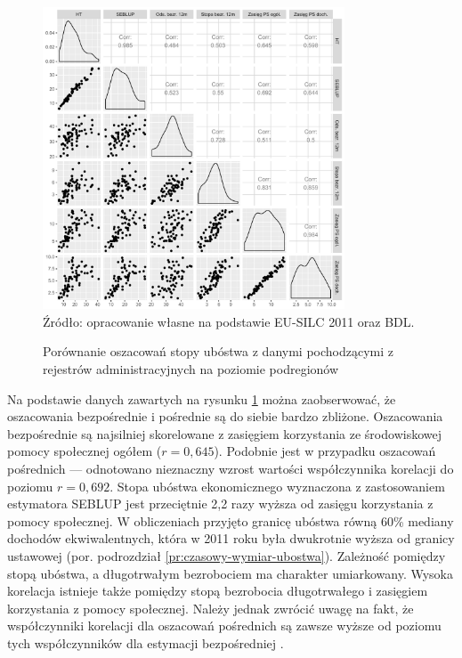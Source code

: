 \begin{figure}[ht]
\caption{Porównanie oszacowań stopy ubóstwa z danymi pochodzącymi z rejestrów administracyjnych na poziomie podregionów}
\centering
\includegraphics[width=0.8\textwidth]{05_wykresy/hcr_podreg_por-1.pdf}\\
\small{Źródło: opracowanie własne na podstawie EU-SILC 2011 oraz BDL.}
\label{fig:hcr_podreg_por}
\end{figure}

Na podstawie danych zawartych na rysunku \ref{fig:hcr_podreg_por} można zaobserwować, że oszacowania bezpośrednie i pośrednie są do siebie bardzo zbliżone. Oszacowania bezpośrednie są najsilniej skorelowane z zasięgiem korzystania ze środowiskowej pomocy społecznej ogółem ($r=0,645$). Podobnie jest w przypadku oszacowań pośrednich --- odnotowano nieznaczny wzrost wartości współczynnika korelacji do poziomu $r=0,692$. Stopa ubóstwa ekonomicznego wyznaczona z zastosowaniem estymatora SEBLUP jest przeciętnie 2,2 razy wyższa od zasięgu korzystania z pomocy społecznej. W obliczeniach przyjęto granicę ubóstwa równą 60\% mediany dochodów ekwiwalentnych, która w 2011 roku była dwukrotnie wyższa od granicy ustawowej (por. podrozdział \ref{pr:czasowy-wymiar-ubostwa}). Zależność pomiędzy stopą ubóstwa, a długotrwałym bezrobociem ma charakter umiarkowany. Wysoka korelacja istnieje także pomiędzy stopą bezrobocia długotrwałego i zasięgiem korzystania z pomocy społecznej. Należy jednak zwrócić uwagę na fakt, że współczynniki korelacji dla oszacowań pośrednich są zawsze wyższe od poziomu tych współczynników dla estymacji bezpośredniej \citep{wawrowski2016}.

